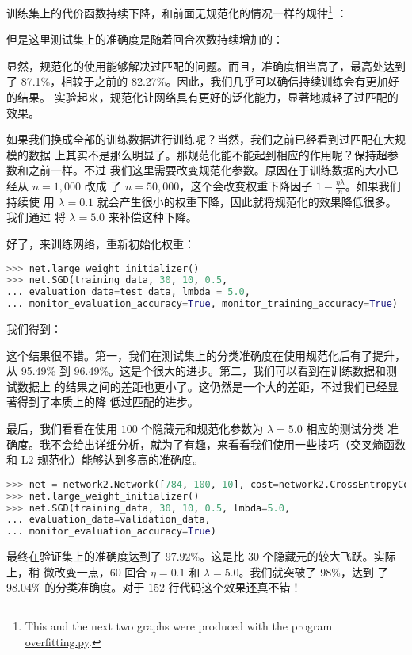 训练集上的代价函数持续下降，和前面无规范化的情况一样的规律\footnote{This and the
  next two graphs were produced with the program
  \href{https://github.com/mnielsen/neural-networks-and-deep-learning/blob/master/fig/overfitting.py}{overfitting.py}.}
：

但是这里测试集上的准确度是随着回合次数持续增加的：

显然，规范化的使用能够解决过匹配的问题。而且，准确度相当高了，最高处达到
了 87.1\%，相较于之前的 82.27\%。因此，我们几乎可以确信持续训练会有更加好的结果。
实验起来，规范化让网络具有更好的泛化能力，显著地减轻了过匹配的效果。

如果我们换成全部的训练数据进行训练呢？当然，我们之前已经看到过匹配在大规模的数据
上其实不是那么明显了。那规范化能不能起到相应的作用呢？保持超参数和之前一样。不过
我们这里需要改变规范化参数。原因在于训练数据的大小已经从 $n=1,000$ 改成
了 $n=50,000$，这个会改变权重下降因子 $1-\frac{\eta\lambda}{n}$。如果我们持续使
用 $\lambda = 0.1$ 就会产生很小的权重下降，因此就将规范化的效果降低很多。我们通过
将 $\lambda = 5.0$ 来补偿这种下降。

好了，来训练网络，重新初始化权重：

\begin{lstlisting}[language=Python]
>>> net.large_weight_initializer()
>>> net.SGD(training_data, 30, 10, 0.5,
... evaluation_data=test_data, lmbda = 5.0,
... monitor_evaluation_accuracy=True, monitor_training_accuracy=True)
\end{lstlisting}

我们得到：

这个结果很不错。第一，我们在测试集上的分类准确度在使用规范化后有了提升，
从 95.49\% 到 96.49\%。这是个很大的进步。第二，我们可以看到在训练数据和测试数据上
的结果之间的差距也更小了。这仍然是一个大的差距，不过我们已经显著得到了本质上的降
低过匹配的进步。

最后，我们看看在使用 $100$ 个隐藏元和规范化参数为 $\lambda = 5.0$ 相应的测试分类
准确度。我不会给出详细分析，就为了有趣，来看看我们使用一些技巧（交叉熵函数和 L2
规范化）能够达到多高的准确度。

\begin{lstlisting}[language=Python]
>>> net = network2.Network([784, 100, 10], cost=network2.CrossEntropyCost)
>>> net.large_weight_initializer()
>>> net.SGD(training_data, 30, 10, 0.5, lmbda=5.0,
... evaluation_data=validation_data,
... monitor_evaluation_accuracy=True)
\end{lstlisting}

最终在验证集上的准确度达到了 97.92\%。这是比 $30$ 个隐藏元的较大飞跃。实际上，稍
微改变一点，$60$ 回合 $\eta=0.1$ 和 $\lambda = 5.0$。我们就突破了 98\%，达到
了 98.04\% 的分类准确度。对于 $152$ 行代码这个效果还真不错！

